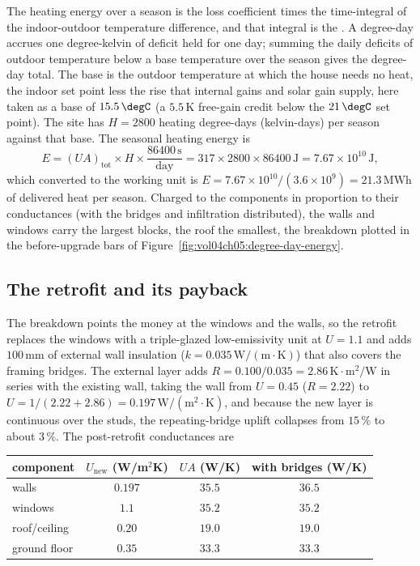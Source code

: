 The heating energy over a season is the loss coefficient times the
time-integral of the indoor-outdoor temperature difference, and that
integral is the . A degree-day accrues one
degree-kelvin of deficit held for one day; summing the daily deficits of
outdoor temperature below a base temperature over the season gives the
degree-day total. The base is the outdoor temperature at which the
house needs no heat, the indoor set point less the rise that internal
gains and solar gain supply, here taken as a base of $15.5\,\degC$ (a
$5.5\,\si{\kelvin}$ free-gain credit below the $21\,\degC$ set point). The
site has $H = 2800$ heating degree-days (kelvin-days) per season against
that base. The seasonal heating energy is
\[
E = (UA)_{\text{tot}} \times H \times \frac{86400\,\text{s}}{\text{day}}
= 317 \times 2800 \times 86400\,\text{J} = 7.67 \times 10^{10}\,\text{J},
\]
which converted to the working unit is $E = 7.67\times10^{10}/(3.6\times
10^9) = 21.3\,\text{MWh}$ of delivered heat per season. Charged to the
components in proportion to their conductances (with the bridges and
infiltration distributed), the walls and windows carry the largest blocks,
the roof the smallest, the breakdown plotted in the before-upgrade bars of
Figure~\ref{fig:vol04ch05:degree-day-energy}.



\subsection{The retrofit and its payback}

The breakdown points the money at the windows and the walls, so the
retrofit replaces the windows with a triple-glazed low-emissivity unit at
$U = 1.1$ and adds $100\,\si{\milli\meter}$ of external wall insulation
($k = 0.035\,\text{W}/(\text{m}\cdot\si{\kelvin})$) that also covers the
framing bridges. The external layer adds $R = 0.100/0.035 = 2.86\,\si{
\kelvin}\cdot\text{m}^2/\text{W}$ in series with the existing wall, taking
the wall from $U = 0.45$ ($R = 2.22$) to $U = 1/(2.22 + 2.86) = 0.197\,
\text{W}/(\text{m}^2\cdot\si{\kelvin})$, and because the new layer is
continuous over the studs, the repeating-bridge uplift collapses from
$15\,\%$ to about $3\,\%$. The post-retrofit conductances are

\begin{center}
\begin{tabular}{lccc}
\toprule
component & $U_{\text{new}}$ (W/m$^2$K) & $UA$ (W/K) & with bridges (W/K) \\
\midrule
walls & $0.197$ & $35.5$ & $36.5$ \\
windows & $1.1$ & $35.2$ & $35.2$ \\
roof/ceiling & $0.20$ & $19.0$ & $19.0$ \\
ground floor & $0.35$ & $33.3$ & $33.3$ \\
\bottomrule
\end{tabular}
\end{center}

